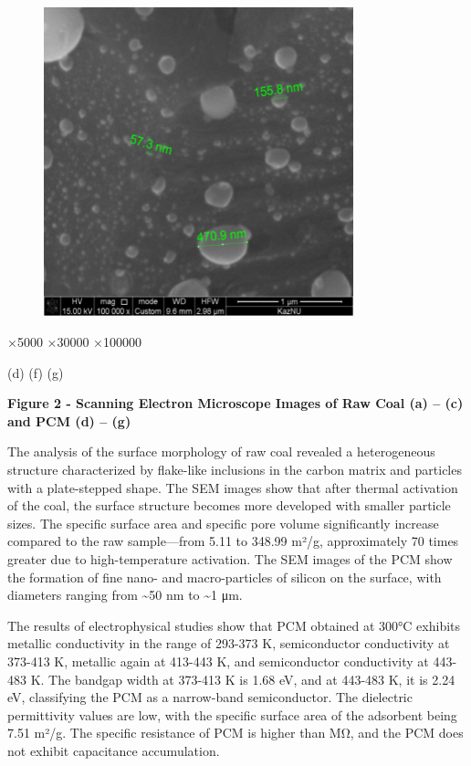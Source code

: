 \begin{figure}[H]
	\centering
	\includegraphics[width=0.8\textwidth]{assets/1072}
	\caption*{}
\end{figure}

×5000 ×30000 ×100000

(d) (f) (g)

\textbf{Figure 2 - Scanning Electron Microscope Images of Raw Coal (a)
-- (c) and PCM (d) -- (g)}

The analysis of the surface morphology of raw coal revealed a
heterogeneous structure characterized by flake-like inclusions in the
carbon matrix and particles with a plate-stepped shape. The SEM images
show that after thermal activation of the coal, the surface structure
becomes more developed with smaller particle sizes. The specific surface
area and specific pore volume significantly increase compared to the raw
sample---from 5.11 to 348.99 m²/g, approximately 70 times greater due to
high-temperature activation. The SEM images of the PCM show the
formation of fine nano- and macro-particles of silicon on the surface,
with diameters ranging from \textasciitilde50 nm to \textasciitilde1 μm.

The results of electrophysical studies show that PCM obtained at 300°C
exhibits metallic conductivity in the range of 293-373 K, semiconductor
conductivity at 373-413 K, metallic again at 413-443 K, and
semiconductor conductivity at 443-483 K. The bandgap width at 373-413 K
is 1.68 eV, and at 443-483 K, it is 2.24 eV, classifying the PCM as a
narrow-band semiconductor. The dielectric permittivity values are low,
with the specific surface area of the adsorbent being 7.51 m²/g. The
specific resistance of PCM is higher than MΩ, and the PCM does not
exhibit capacitance accumulation.


